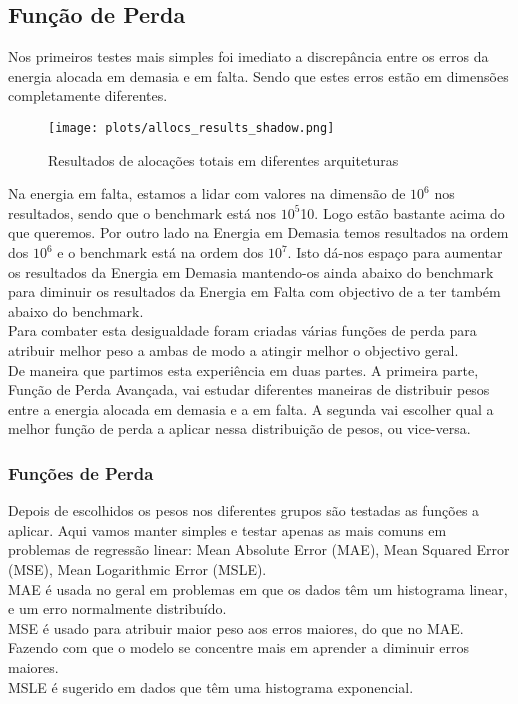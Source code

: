\subsection{Função de Perda}

Nos primeiros testes mais simples foi imediato a discrepância entre os erros da energia alocada em demasia e em falta. Sendo que estes erros estão em dimensões completamente diferentes.
\begin{figure}[H]
    \centering
    \texttt{[image: plots/allocs\_results\_shadow.png]}
    \caption{Resultados de alocações totais em diferentes arquiteturas}
    \label{fig:resexparchs}
  \end{figure}

Na energia em falta, estamos a lidar com valores na dimensão de $10^{6}$ nos resultados, sendo que o benchmark está nos $10^{5}$10. Logo estão bastante acima do que queremos. Por outro lado na Energia em Demasia temos resultados na ordem dos $10^{6}$ e o benchmark está na ordem dos $10^{7}$. Isto dá-nos espaço para aumentar os resultados da Energia em Demasia mantendo-os ainda abaixo do benchmark para diminuir os resultados da Energia em Falta com objectivo de a ter também abaixo do benchmark.\\
Para combater esta desigualdade foram criadas várias funções de perda para atribuir melhor peso a ambas de modo a atingir melhor o objectivo geral.\\
De maneira que partimos esta experiência em duas partes. A primeira parte, Função de Perda Avançada, vai estudar diferentes maneiras de distribuir pesos entre a energia alocada em demasia e a em falta. A segunda vai escolher qual a melhor função de perda a aplicar nessa distribuição de pesos, ou vice-versa.\\


\subsubsection{Funções de Perda}
Depois de escolhidos os pesos nos diferentes grupos são testadas as funções a aplicar. Aqui vamos manter simples e testar apenas as mais comuns em problemas de regressão linear: Mean Absolute Error (\gls{MAE}), Mean Squared Error (\gls{MSE}), Mean Logarithmic Error (\gls{MSLE}).\\
\gls{MAE} é usada no geral em problemas em que os dados têm um histograma linear, e um erro normalmente distribuído.\\
\gls{MSE} é usado para atribuir maior peso aos erros maiores, do que no \gls{MAE}. Fazendo com que o modelo se concentre mais em aprender a diminuir erros maiores.\\
\gls{MSLE} é sugerido em dados que têm uma histograma exponencial.\\

